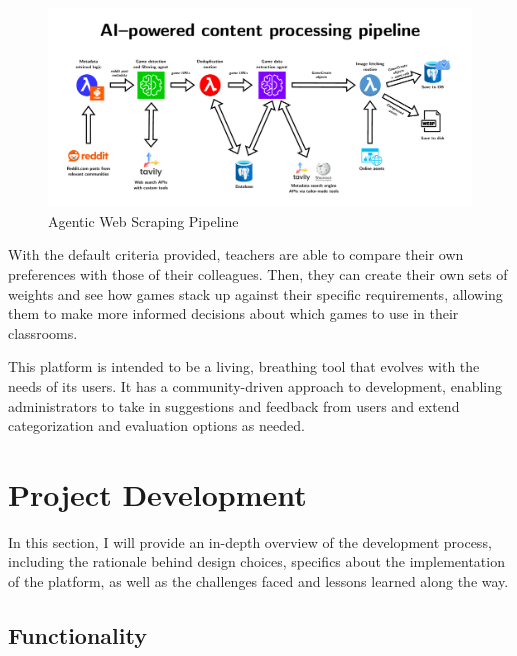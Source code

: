 \documentclass[11pt,italian,a4paper]{article}
\begin{document}
\begin{figure}[H]
    \centering
    \includegraphics[width=\textwidth]{figures/pdfs/ai_pipeline.pdf}
    \caption{Agentic Web Scraping Pipeline}
\end{figure}

With the default criteria provided, teachers are able to compare their own preferences with those of their colleagues. Then, they can create their own sets of weights and see how games stack up against their specific requirements, allowing them to make more informed decisions about which games to use in their classrooms.

This platform is intended to be a living, breathing tool that evolves with the needs of its users. It has a community-driven approach to development, enabling administrators to take in suggestions and feedback from users and extend categorization and evaluation options as needed.

\section{Project Development}

In this section, I will provide an in-depth overview of the development process, including the rationale behind design choices, specifics about the implementation of the platform, as well as the challenges faced and lessons learned along the way.

\subsection{Functionality}
\end{document}
